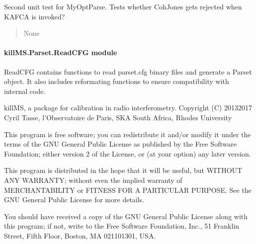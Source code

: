 \documentclass[letterpaper,10pt,english]{sphinxmanual}
\begin{document}
\begin{fulllineitems}
\label{\detokenize{api/killMS.Parset:killMS.Parset.PrintOptParse.test2}}
\pysigstartsignatures
{}
\pysigstopsignatures
\sphinxAtStartPar
Second unit test for MyOptParse.
Tests whether CohJones gets rejected when KAFCA is invoked?
\begin{quote}\begin{description}
\sphinxAtStartPar
None

\end{description}\end{quote}

\end{fulllineitems}



\paragraph{killMS.Parset.ReadCFG module}
\label{\detokenize{api/killMS.Parset:module-killMS.Parset.ReadCFG}}\label{\detokenize{api/killMS.Parset:killms-parset-readcfg-module}}
\sphinxAtStartPar
ReadCFG contains functions to read parset.cfg binary files and generate a Parset object.
It also includes reformating functions to ensure compatibility with internal code.

\sphinxAtStartPar
killMS, a package for calibration in radio interferometry.
Copyright (C) 2013\sphinxhyphen{}2017  Cyril Tasse, l’Observatoire de Paris,
SKA South Africa, Rhodes University

\sphinxAtStartPar
This program is free software; you can redistribute it and/or
modify it under the terms of the GNU General Public License
as published by the Free Software Foundation; either version 2
of the License, or (at your option) any later version.

\sphinxAtStartPar
This program is distributed in the hope that it will be useful,
but WITHOUT ANY WARRANTY; without even the implied warranty of
MERCHANTABILITY or FITNESS FOR A PARTICULAR PURPOSE.  See the
GNU General Public License for more details.

\sphinxAtStartPar
You should have received a copy of the GNU General Public License
along with this program; if not, write to the Free Software
Foundation, Inc., 51 Franklin Street, Fifth Floor, Boston, MA  02110\sphinxhyphen{}1301, USA.
\end{document}
